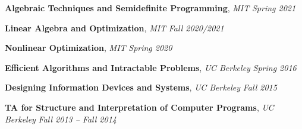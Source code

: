 \documentclass[9pt]{article}
\newenvironment{changemargin}[2]{%
  \begin{list}{}{%
      \setlength{\topsep}{0pt}%
      \setlength{\leftmargin}{#1}%
      \setlength{\rightmargin}{#2}%
      \setlength{\listparindent}{\parindent}%
      \setlength{\itemindent}{\parindent}%
      \setlength{\parsep}{\parskip}%
    }%
  \item[]}{\end{list}
}
\newenvironment{body} {
  \vspace*{-16pt}
  \begin{changemargin}{-0.25in}{-0.5in}
  }
  {\end{changemargin}
}
\begin{document}
\begin{body}
  \vspace{14pt}

  \textbf{Algebraic Techniques and Semidefinite Programming}, \emph{MIT}
  \hfill \emph{Spring 2021} \\
  \smallskip

  \textbf{Linear Algebra and Optimization}, \emph{MIT} \hfill \emph{Fall 2020/2021} \\
  \smallskip


  \textbf{Nonlinear Optimization}, \emph{MIT} \hfill \emph{Spring 2020}\\
  \smallskip

  \textbf{Efficient Algorithms and Intractable Problems}, \emph{UC Berkeley} \hfill \emph{Spring 2016}\\
  \smallskip

  \textbf{Designing Information Devices and Systems}, \emph{UC Berkeley} \hfill \emph{Fall 2015}\\
  \smallskip

  \textbf{TA for Structure and Interpretation of Computer Programs}, \emph{UC Berkeley} \hfill \emph{Fall 2013 -- Fall 2014}\\
  \smallskip


\end{body}
\end{document}
